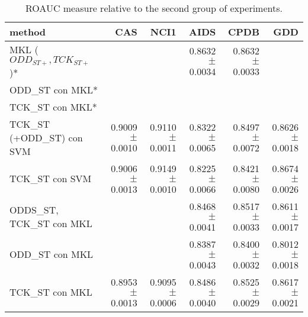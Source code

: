 \begin{landscape}
\begin{table}[ht]
        \centering
        \begin{tabular}{|l|r|r|r|r|r|}
            \hline
            method&CAS&NCI1&AIDS&CPDB&GDD\\
            \hline
            MKL ($ODD_{ST+}, TCK_{ST+}$)*&&&0.8632 $\pm$ 0.0034&0.8632 $\pm$ 0.0033&\\
            \hline
            ODD\_ST con MKL*&&&&&\\
            \hline
            TCK\_ST con MKL*&&&&&\\
            \hline
            TCK\_ST (+ODD\_ST) con SVM&0.9009 $\pm$ 0.0010&0.9110 $\pm$ 0.0011&0.8322 $\pm$ 0.0065&0.8497 $\pm$ 0.0072&0.8626 $\pm$ 0.0018\\
            \hline
            TCK\_ST con SVM&0.9006 $\pm$ 0.0013&0.9149 $\pm$ 0.0010&0.8225 $\pm$ 0.0066&0.8421 $\pm$ 0.0080&0.8674 $\pm$ 0.0026\\
            \hline
            ODDS\_ST, TCK\_ST con MKL&&&0.8468 $\pm$ 0.0041&0.8517 $\pm$ 0.0033&0.8611 $\pm$ 0.0017\\
            \hline
            ODD\_ST con MKL&&&0.8387 $\pm$ 0.0043&0.8400 $\pm$ 0.0032&0.8012$\pm$ 0.0018\\
            \hline
            TCK\_ST con MKL&0.8953 $\pm$ 0.0013&0.9095 $\pm$ 0.0006&0.8486 $\pm$ 0.0040&0.8525 $\pm$ 0.0029&0.8617 $\pm$ 0.0021\\
            \hline
        \end{tabular}
        \label{table:results_stp}
        \caption{ROAUC measure relative to the second group of experiments.}
    \end{table}


\end{landscape}
